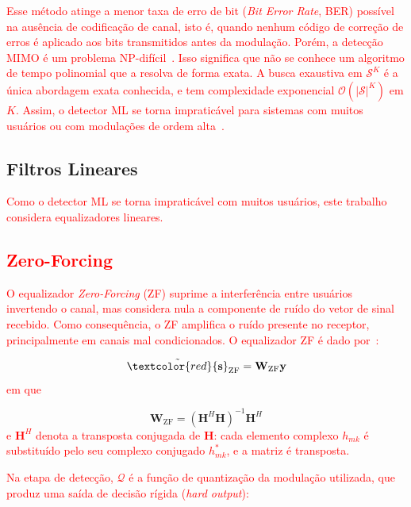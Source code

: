 \textcolor{red}{Esse método atinge a menor taxa de erro de bit (\textit{Bit Error Rate}, BER) possível na ausência de codificação de canal, isto é, quando nenhum código de correção de erros é aplicado aos bits transmitidos antes da modulação. Porém, a detecção MIMO é um problema NP-difícil~\cite{zero-forcing}. Isso significa que não se conhece um algoritmo de tempo polinomial que a resolva de forma exata. A busca exaustiva em $\mathcal{S}^{K}$ é a única abordagem exata conhecida, e tem complexidade exponencial $\mathcal{O}(|\mathcal{S}|^K)$ em $K$. Assim, o detector ML se torna impraticável para sistemas com muitos usuários ou com modulações de ordem alta~\cite{bello2022algorithms}.}


\subsection{Filtros Lineares}

\textcolor{red}{Como o detector ML se torna impraticável com muitos usuários, este trabalho considera equalizadores lineares.}

\subsection{\texorpdfstring{\textcolor{red}{Zero-Forcing}}{Zero-Forcing}}

\textcolor{red}{O equalizador \textit{Zero-Forcing} (ZF) suprime a interferência entre usuários invertendo o canal, mas considera nula a componente de ruído do vetor de sinal recebido. Como consequência, o ZF amplifica o ruído presente no receptor, principalmente em canais mal condicionados. O equalizador ZF é dado por~\cite{zero-forcing}:}

\begin{equation}
\tilde{\textcolor{red}{\mathbf{s}}}_\text{ZF} =
\mathbf{W}_\text{ZF}\mathbf{y}
\label{eq:zf_estimate}
\end{equation}
\textcolor{red}{em que}

\begin{equation}
\mathbf{W}_\text{ZF}=
\left(\mathbf{H}^H\mathbf{H}\right)^{-1}\mathbf{H}^H
\label{eq:zf_filter}
\end{equation}
\textcolor{red}{e $\mathbf{H}^H$ denota a transposta conjugada de $\mathbf{H}$: cada elemento complexo $h_{mk}$ é substituído pelo seu complexo conjugado $h_{mk}^*$, e a matriz é transposta.}


\textcolor{red}{Na etapa de detecção, $\mathcal{Q}$ é a função de quantização da modulação utilizada, que produz uma saída de decisão rígida (\textit{hard output}):}

